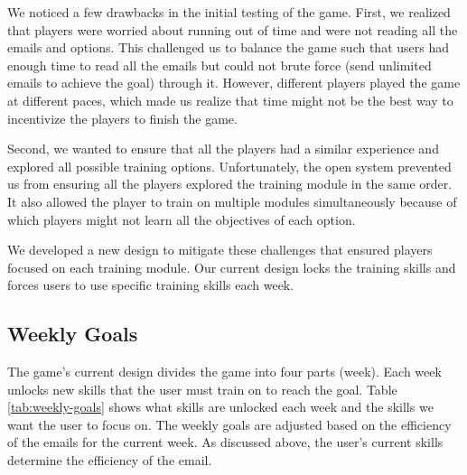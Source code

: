 We noticed a few drawbacks in the initial testing of the game. First, we realized that players were worried about running out of time and were not reading all the emails and options. This challenged us to balance the game such that users had enough time to read all the emails but could not brute force (send unlimited emails to achieve the goal) through it. However, different players played the game at different paces, which made us realize that time might not be the best way to incentivize the players to finish the game.

Second, we wanted to ensure that all the players had a similar experience and explored all possible training options. Unfortunately, the open system prevented us from ensuring all the players explored the training module in the same order. It also allowed the player to train on multiple modules simultaneously because of which players might not learn all the objectives of each option.

We developed a new design to mitigate these challenges that ensured players focused on each training module. Our current design locks the training skills and forces users to use specific training skills each week.

\subsection{Weekly Goals}
The game's current design divides the game into four parts (week). Each week unlocks new skills that the user must train on to reach the goal. Table \ref{tab:weekly-goals} shows what skills are unlocked each week and the skills we want the user to focus on. The weekly goals are adjusted based on the efficiency of the emails for the current week. As discussed above, the user's current skills determine the efficiency of the email.

\begin{table}[ht]
    \centering
    \caption{Weekly goals}
    \label{tab:weekly-goals}
\end{table}

